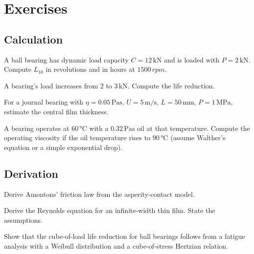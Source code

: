 \section{Exercises}

\subsection*{Calculation}

\begin{exercise}
A ball bearing has dynamic load capacity $C = 12\,\si{\kilo\newton}$ and is loaded with $P = 2\,\si{\kilo\newton}$. Compute $L_{10}$ in revolutions and in hours at $1500\,\si{rpm}$.
\end{exercise}

\begin{exercise}
A bearing's load increases from $2$ to $3\,\si{\kilo\newton}$. Compute the life reduction.
\end{exercise}

\begin{exercise}
For a journal bearing with $\eta = 0.05\,\si{\pascal\second}$, $U = 5\,\si{\meter\per\second}$, $L = 50\,\si{\milli\meter}$, $P = 1\,\si{\mega\pascal}$, estimate the central film thickness.
\end{exercise}

\begin{exercise}
A bearing operates at $60\,\si{\degreeCelsius}$ with a $0.32\,\si{\pascal\second}$ oil at that temperature. Compute the operating viscosity if the oil temperature rises to $90\,\si{\degreeCelsius}$ (assume Walther's equation or a simple exponential drop).
\end{exercise}

\subsection*{Derivation}

\begin{exercise}
Derive Amontons' friction law from the asperity-contact model.
\end{exercise}

\begin{exercise}
Derive the Reynolds equation for an infinite-width thin film. State the assumptions.
\end{exercise}

\begin{exercise}
Show that the cube-of-load life reduction for ball bearings follows from a fatigue analysis with a Weibull distribution and a cube-of-stress Hertzian relation.
\end{exercise}

